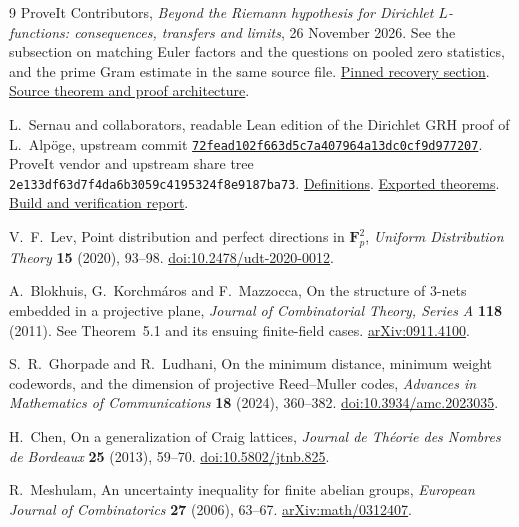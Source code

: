 \documentclass[11pt,letterpaper]{article}
\theoremstyle{remark}
\begin{document}
\begin{thebibliography}{9}
 ProveIt Contributors,
\emph{Beyond the Riemann hypothesis for Dirichlet $L$-functions:
consequences, transfers and limits}, 26 November 2026.
See the subsection on matching Euler factors and the questions on pooled
zero statistics, and the prime Gram estimate in the same source file.
\href{https://github.com/VladimirReshetnikov/ProveIt/blob/2a9f8e3ee74a1824d57546f0b1b4f1cef5df93d6/Analysis/GeneralizedRiemannHypothesis/Article/sections/rec.tex}{Pinned recovery section}.
\href{https://github.com/VladimirReshetnikov/ProveIt/blob/2a9f8e3ee74a1824d57546f0b1b4f1cef5df93d6/Analysis/GeneralizedRiemannHypothesis/Article/sections/src.tex}{Source theorem and proof architecture}.

 L.~Sernau and collaborators, readable Lean edition of the
Dirichlet GRH proof of L.~Alp\"oge, upstream commit
\href{https://github.com/lsernau/grh-lean/tree/72fead102f663d5c7a407964a13dc0cf9d977207/grh}{\texttt{72fead102f663d5c7a407964a13dc0cf9d977207}}.
ProveIt vendor and upstream share tree
\texttt{2e133df63d7f4da6b3059c4195324f8e9187ba73}.
\href{https://github.com/VladimirReshetnikov/ProveIt/blob/2a9f8e3ee74a1824d57546f0b1b4f1cef5df93d6/Analysis/GeneralizedRiemannHypothesis/vendor/grh-lean/grh/src/Statements.lean}{Definitions}.
\href{https://github.com/VladimirReshetnikov/ProveIt/blob/2a9f8e3ee74a1824d57546f0b1b4f1cef5df93d6/Analysis/GeneralizedRiemannHypothesis/vendor/grh-lean/grh/src/Main.lean}{Exported theorems}.
\href{https://github.com/VladimirReshetnikov/ProveIt/blob/2a9f8e3ee74a1824d57546f0b1b4f1cef5df93d6/Analysis/GeneralizedRiemannHypothesis/vendor/grh-lean/grh/README.md}{Build and verification report}.

 V.~F.~Lev, Point distribution and perfect directions in
$\mathbf F_p^2$, \emph{Uniform Distribution Theory} \textbf{15} (2020),
93--98. \href{https://doi.org/10.2478/udt-2020-0012}{doi:10.2478/udt-2020-0012}.

 A.~Blokhuis, G.~Korchm\'aros and F.~Mazzocca,
On the structure of $3$-nets embedded in a projective plane,
\emph{Journal of Combinatorial Theory, Series A} \textbf{118} (2011).
See Theorem~5.1 and its ensuing finite-field cases.
\href{https://arxiv.org/abs/0911.4100}{arXiv:0911.4100}.

 S.~R.~Ghorpade and R.~Ludhani, On the minimum distance,
minimum weight codewords, and the dimension of projective Reed--Muller
codes, \emph{Advances in Mathematics of Communications} \textbf{18}
(2024), 360--382. \href{https://doi.org/10.3934/amc.2023035}{doi:10.3934/amc.2023035}.

 H.~Chen, On a generalization of Craig lattices,
\emph{Journal de Th\'eorie des Nombres de Bordeaux} \textbf{25} (2013),
59--70. \href{https://doi.org/10.5802/jtnb.825}{doi:10.5802/jtnb.825}.

 R.~Meshulam, An uncertainty inequality for finite
abelian groups, \emph{European Journal of Combinatorics} \textbf{27}
(2006), 63--67. \href{https://arxiv.org/abs/math/0312407}{arXiv:math/0312407}.
\end{thebibliography}
\end{document}
